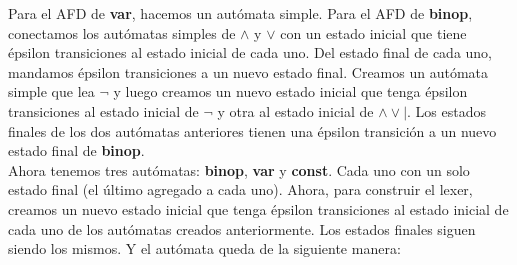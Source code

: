 \documentclass[12pt, letterpaper]{article}
\begin{document}
\begin{enumerate}
    Para el AFD de \textbf{var}, hacemos un autómata simple.
    Para el AFD de \textbf{binop}, conectamos los autómatas simples de $\wedge$ y $\vee$ con un estado inicial que tiene épsilon transiciones al estado inicial de cada uno. Del estado final de cada uno, mandamos épsilon transiciones a un nuevo estado final.
    Creamos un autómata simple que lea $\neg$ y luego creamos un nuevo estado inicial que tenga épsilon transiciones al estado inicial de $\neg$ y otra al estado inicial de $\wedge\vee|$. Los estados finales de los dos autómatas anteriores tienen una épsilon transición a un nuevo estado final de \textbf{binop}.\\Ahora tenemos tres autómatas: \textbf{binop}, \textbf{var} y \textbf{const}. Cada uno con un solo estado final (el último agregado a cada uno).
    \newpage
    Ahora, para construir el lexer, creamos un nuevo estado inicial que tenga épsilon transiciones al estado inicial de cada uno de los autómatas creados anteriormente. Los estados finales siguen siendo los mismos. Y el autómata queda de la siguiente manera:


    \begin{figure}[htbp]
      \noindent
\end{figure}
\end{enumerate}
\end{document}
